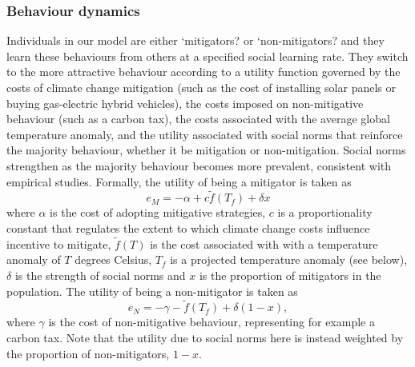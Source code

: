 \documentclass[10pt,letterpaper]{article}
\begin{document}

\subsubsection*{Behaviour dynamics} Individuals in our model are either `mitigators? or `non-mitigators? and they learn these behaviours from others at a specified social learning rate. They switch to the more attractive behaviour according to a utility function governed by the costs of climate change mitigation (such as the cost of installing solar panels or buying gas-electric hybrid vehicles), the costs imposed on non-mitigative behaviour (such as a carbon tax), the costs associated with the average global temperature anomaly, and the utility associated with social norms that reinforce the majority behaviour, whether it be mitigation or non-mitigation. Social norms strengthen as the majority behaviour becomes more prevalent, consistent with empirical studies\cite{bollinger12,nolan08}. Formally, the utility of being a mitigator is taken as
\begin{equation}
e_M = -\alpha + c \tilde{f}(T_f) +  \delta x
\end{equation}
where $\alpha$ is the cost of adopting mitigative strategies, $c$ is a proportionality constant that regulates the extent to which climate change costs influence incentive to mitigate, $\tilde{f}(T)$ is the cost associated with with a temperature anomaly of $T$ degrees Celsius, $T_f$ is a projected temperature anomaly (see below), $\delta$ is the strength of social norms and $x$ is the proportion of mitigators in the population. The utility of being a non-mitigator is taken as
\begin{equation}
e_N = -\gamma -\tilde{f}(T_f) + \delta(1-x),
\end{equation}
where $\gamma$ is the cost of non-mitigative behaviour, representing for example a carbon tax. Note that the utility due to social norms here is instead weighted by the proportion of non-mitigators, $1-x$.
\end{document}
